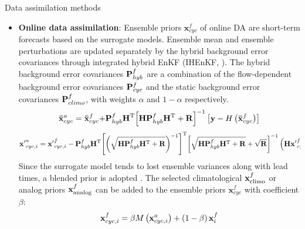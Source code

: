 \documentclass[final]{beamer}
\newlength{\colwidth}
\begin{document}
\begin{frame}[t]
\begin{columns}[t]
\begin{column}{\colwidth}
\begin{block}{Data assimilation methods}
\begin{itemize}
    					\item \textbf{Online data assimilation}: Ensemble priors $\mathbf{x}_{cyc}^f$ of online DA  are short-term forecasts based on the surrogate models. Ensemble mean and ensemble perturbations are updated separately by the hybrid background error covariances through integrated hybrid EnKF (IHEnKF, \cite{lei_integrated_2021}). The hybrid background error covariances ${\bf{P}}_{hyb}^f$ are a combination of the flow-dependent background error covariances ${\bf{P}}_{cyc}^f$ and the static background error covariances ${\bf{P}}_{climo}^f$, with weights $\alpha$ and $1-\alpha$ respectively.
                         \begin{equation}
                            {\bf{\bar x}}_{cyc}^a = {\bf{\bar x}}_{cyc}^f{\rm{ + }}{\bf{P}}_{hyb}^f{{\bf{H}}^{\rm T}}{\left[ {{\bf{HP}}_{hyb}^f{{\bf{H}}^{\rm T}} + {\bf{R}}} \right]^{ - 1}}\left[ {{\bf{y}} - H\left( {{\bf{\bar x}}_{cyc}^f} \right)} \right]
                        \end{equation}
                        \begin{equation}
                            {\bf{x'}}_{cyc,i}^a = {\bf{x'}}_{cyc,i}^f - {\bf{P}}_{hyb}^f{{\bf{H}}^{\rm T}}{\left[ {{{\left( {\sqrt {{\bf{HP}}_{hyb}^f{{\bf{H}}^{\rm T}} + {\bf{R}}} } \right)}^{ - 1}}} \right]^{\rm T}}{\left[ {\sqrt {{\bf{HP}}_{hyb}^f{{\bf{H}}^{\rm T}} + {\bf{R}}}  + \sqrt {\bf{R}} } \right]^{ - 1}}\left( {{\bf{Hx'}}_{cyc,i}^f} \right)
                        \end{equation}
                        Since the surrogate model tends to lost ensemble variances along with lead times, a blended prior is adopted \parencite{perkins_reconstructing_2017}. The selected climatological $\mathbf{x}_{\rm{climo}}^f$ or analog priors $\mathbf{x}_{\rm{analog}}^f$ can be added to the ensemble priors $\mathbf{x}_{cyc}^f$ with coefficient $\beta$:
                        \begin{equation}
                            {\bf{x}}_{cyc,i}^f = \beta M\left( {{\bf{x}}_{cyc,i}^a} \right) + \left( {1 - \beta } \right){\bf{x}}_{i}^f
                        \end{equation}
    				\end{itemize}
    			\end{block}
       

\end{column}
\end{columns}
\end{frame}
\end{document}
